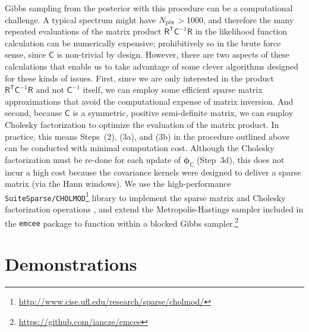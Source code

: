 \documentclass[iop,floatfix]{emulateapj}
\newcommand{\vR}{\mathsf{R}}
\newcommand{\vC}{\mathsf{C}}
\newcommand{\trans}{\mathsf{T}}
\newcommand{\vp}{ {\bm \phi}}
\begin{document}
Gibbs sampling from the posterior with this procedure can be a computational challenge.  A typical 
spectrum might have $N_{\rm pix}$$>$1000, and therefore the many repeated evaluations of the matrix 
product $\vR^{\trans} \vC^{-1} \vR$ in the likelihood function calculation can be numerically 
expensive; prohibitively so in the brute force sense, since $\vC$ is non-trivial by design.  
However, there are two aspects of these calculations that enable us to take advantage of some 
clever algorithms designed for these kinds of issues.  First, since we are only interested in the 
product $\vR^{\trans} \vC^{-1} \vR$ and not $\vC^{-1}$ itself, we can employ some efficient sparse 
matrix approximations that avoid the computational expense of matrix inversion.  And second, 
because $\vC$ is a symmetric, positive semi-definite matrix, we can employ Cholesky factorization
to optimize the evaluation of the matrix product.  In practice, this means Steps~(2), (3a), and 
(3b) in the procedure outlined above can be conducted with minimal computation cost.  Although the
Cholesky factorization must be re-done for each update of $\vp_{\mathsf C}$ (Step~3d), this does 
not incur a high cost because the covariance kernels were designed to deliver a sparse matrix (via 
the Hann windows).  We use the high-performance 
\texttt{SuiteSparse/CHOLMOD}\footnote{\url{http://www.cise.ufl.edu/research/sparse/cholmod/}} 
library to implement the sparse matrix and Cholesky factorization operations \citep{chen08,
davis09}, and extend the Metropolis-Hastings sampler included in the {\tt emcee} package 
\citep{foreman-mackey13} to function within a blocked Gibbs 
sampler.\footnote{\url{https://github.com/iancze/emcee}} \\


\section{Demonstrations} \label{sec:examples}
\end{document}

